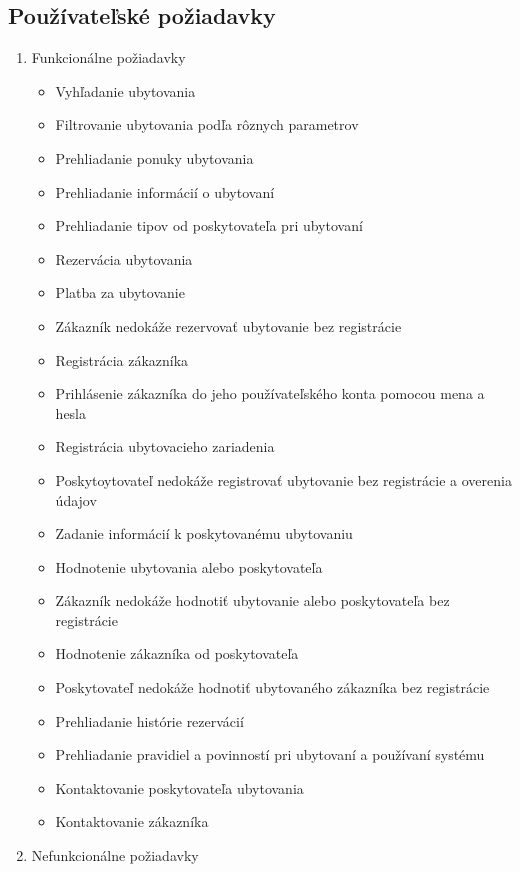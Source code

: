 \subsection{Používateľské požiadavky}
\begin{enumerate}[label=\Alph*.]
    \item Funkcionálne požiadavky
    \begin{itemize}
        \item Vyhľadanie ubytovania
        \item Filtrovanie ubytovania podľa rôznych parametrov
        \item Prehliadanie ponuky ubytovania
        \item Prehliadanie informácií o ubytovaní
        \item Prehliadanie tipov od poskytovateľa pri ubytovaní
        \item Rezervácia ubytovania
        \item Platba za ubytovanie
        \item Zákazník nedokáže rezervovať ubytovanie bez registrácie
        \item Registrácia zákazníka
        \item Prihlásenie zákazníka do jeho používateľského konta pomocou 
        mena a hesla
        \item Registrácia ubytovacieho zariadenia
        \item Poskytoytovateľ nedokáže registrovať ubytovanie bez 
        registrácie a overenia údajov
        \item Zadanie informácií k poskytovanému ubytovaniu
        \item Hodnotenie ubytovania alebo poskytovateľa
        \item Zákazník nedokáže hodnotiť ubytovanie alebo poskytovateľa 
        bez registrácie
        \item Hodnotenie zákazníka od poskytovateľa
        \item Poskytovateľ nedokáže hodnotiť ubytovaného zákazníka bez 
        registrácie
        \item Prehliadanie histórie rezervácií
        \item Prehliadanie pravidiel a povinností pri ubytovaní a 
        používaní systému
        \item Kontaktovanie poskytovateľa ubytovania
        \item Kontaktovanie zákazníka
    \end{itemize}
    \item Nefunkcionálne požiadavky

\end{enumerate}
